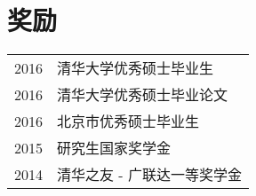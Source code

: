 \documentclass[]{resume_zh}
\begin{document}
\begin{minipage}[t]{0.3\textwidth}




\section{奖励} 
\setlength\tabcolsep{2pt}
\begin{tabular}{ll}
	2016 & 清华大学优秀硕士毕业生\\
	2016 & 清华大学优秀硕士毕业论文\\
	2016 & 北京市优秀硕士毕业生\\
	2015 & 研究生国家奖学金\\
	2014 & 清华之友 - 广联达一等奖学金\\
\end{tabular}
\sectionsep

%
%

\end{minipage} 
\end{document}
